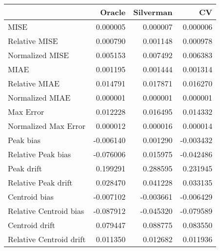 \begin{tabular}{lrrr}
  \hline
 & Oracle & Silverman & CV \\ 
  \hline
MISE & 0.000005 & 0.000007 & 0.000006 \\ 
  Relative MISE & 0.000790 & 0.001148 & 0.000978 \\ 
  Normalized MISE & 0.005153 & 0.007492 & 0.006383 \\ 
  MIAE & 0.001195 & 0.001444 & 0.001314 \\ 
  Relative MIAE & 0.014791 & 0.017871 & 0.016270 \\ 
  Normalized MIAE & 0.000001 & 0.000001 & 0.000001 \\ 
  Max Error & 0.012228 & 0.016495 & 0.014332 \\ 
  Normalized Max Error & 0.000012 & 0.000016 & 0.000014 \\ 
  Peak bias & -0.006140 & 0.001290 & -0.003432 \\ 
  Relative Peak bias & -0.076006 & 0.015975 & -0.042486 \\ 
  Peak drift & 0.199291 & 0.288595 & 0.231945 \\ 
  Relative Peak drift & 0.028470 & 0.041228 & 0.033135 \\ 
  Centroid bias & -0.007102 & -0.003661 & -0.006429 \\ 
  Relative Centroid bias & -0.087912 & -0.045320 & -0.079589 \\ 
  Centroid drift & 0.079447 & 0.088775 & 0.083550 \\ 
  Relative Centroid drift & 0.011350 & 0.012682 & 0.011936 \\ 
   \hline
\end{tabular}
